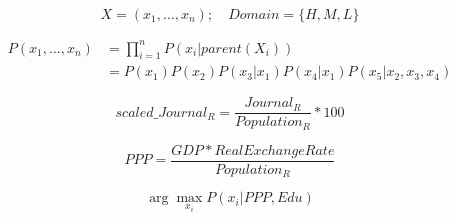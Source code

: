 \documentclass[a4paper]{article}
\begin{document}
\begin{equation}
  X = (x_1, \dotsc, x_n); \quad Domain = \{H, M, L\}
\end{equation}

\begin{align}
  P(x_{1}, \dotsc, x_{n}) &= \prod_{i=1}^n P(x_i|parent(X_i)) \\
  &= P(x_1) P(x_2) P(x_3|x_1) P(x_4|x_1) P(x_5|x_2, x_3, x_4)
\end{align}

\begin{equation}
  scaled\_Journal_R = \frac{Journal_R}{Population_R} * 100
\end{equation}

\begin{equation}
  PPP = \frac{GDP * RealExchangeRate}{Population_R}
\end{equation}

\begin{equation}
  \arg\max_{x_i} P(x_i|PPP,Edu)
\end{equation}
\end{document}
